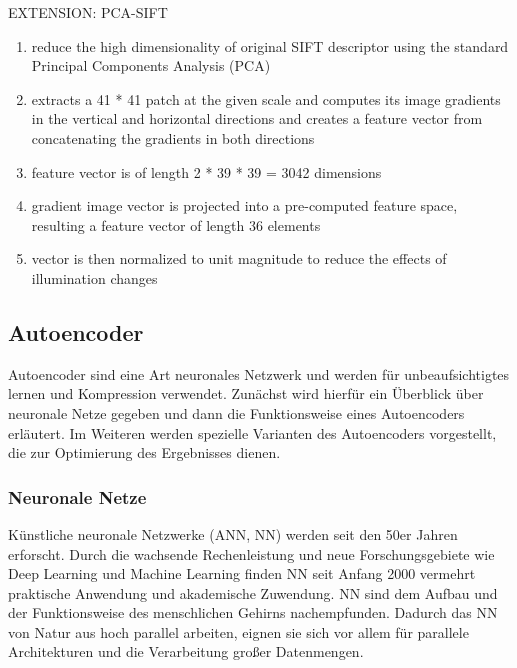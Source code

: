 EXTENSION: PCA-SIFT

\begin{enumerate}
	\item reduce the high dimensionality of original SIFT descriptor using the
standard Principal Components Analysis (PCA)
	\item extracts a 41 * 41 patch at the given
scale and computes its image gradients in the vertical and horizontal directions and
creates a feature vector from concatenating the gradients in both directions
	\item feature vector is of length 2 * 39 * 39 = 3042 dimensions
	\item gradient image vector is projected into a pre-computed feature space, resulting a feature vector of length 36 elements
	\item vector is then normalized to unit magnitude to reduce
the effects of illumination changes
\end{enumerate}

\subsection{Autoencoder}

Autoencoder sind eine Art neuronales Netzwerk und werden für unbeaufsichtigtes lernen und Kompression verwendet. Zunächst wird hierfür ein Überblick über neuronale Netze gegeben und dann die Funktionsweise eines Autoencoders erläutert. Im Weiteren werden spezielle Varianten des Autoencoders vorgestellt, die zur Optimierung des Ergebnisses dienen.

\subsubsection{Neuronale Netze}

Künstliche neuronale Netzwerke (ANN, NN) werden seit den 50er Jahren erforscht. Durch die wachsende Rechenleistung und neue Forschungsgebiete wie Deep Learning und Machine Learning finden NN seit Anfang 2000 vermehrt praktische Anwendung und akademische Zuwendung. NN sind dem Aufbau und der Funktionsweise des menschlichen Gehirns nachempfunden. Dadurch das NN von Natur aus hoch parallel arbeiten, eignen sie sich vor allem für parallele Architekturen und die Verarbeitung großer Datenmengen. 

